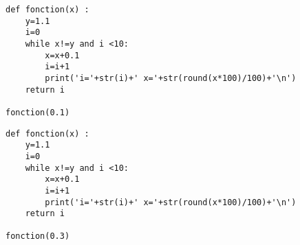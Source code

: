 \begin{minipage}{0.5\textwidth}
\question{}

\begin{lstlisting}
def fonction(x) :
    y=1.1
    i=0
    while x!=y and i <10:
        x=x+0.1
        i=i+1
        print('i='+str(i)+' x='+str(round(x*100)/100)+'\n')
    return i

fonction(0.1)
\end{lstlisting}
\end{minipage}
\begin{minipage}{0.5\textwidth}
\question{}

\begin{lstlisting}
def fonction(x) :
    y=1.1
    i=0
    while x!=y and i <10:
        x=x+0.1
        i=i+1
        print('i='+str(i)+' x='+str(round(x*100)/100)+'\n')
    return i

fonction(0.3)
\end{lstlisting}
\end{minipage}




